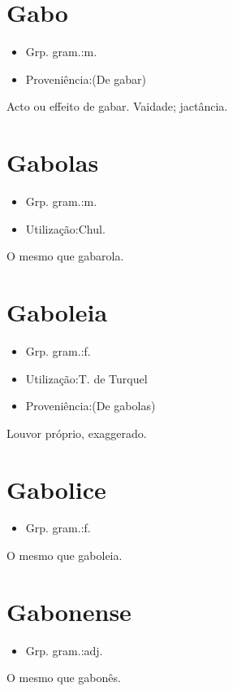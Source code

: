 \section{Gabo}
\begin{itemize}
\item {Grp. gram.:m.}
\end{itemize}
\begin{itemize}
\item {Proveniência:(De \textunderscore gabar\textunderscore )}
\end{itemize}
Acto ou effeito de gabar.
Vaidade; jactância.
\section{Gabolas}
\begin{itemize}
\item {Grp. gram.:m.}
\end{itemize}
\begin{itemize}
\item {Utilização:Chul.}
\end{itemize}
O mesmo que \textunderscore gabarola\textunderscore .
\section{Gaboleia}
\begin{itemize}
\item {Grp. gram.:f.}
\end{itemize}
\begin{itemize}
\item {Utilização:T. de Turquel}
\end{itemize}
\begin{itemize}
\item {Proveniência:(De \textunderscore gabolas\textunderscore )}
\end{itemize}
Louvor próprio, exaggerado.
\section{Gabolice}
\begin{itemize}
\item {Grp. gram.:f.}
\end{itemize}
O mesmo que \textunderscore gaboleia\textunderscore .
\section{Gabonense}
\begin{itemize}
\item {Grp. gram.:adj.}
\end{itemize}
O mesmo que \textunderscore gabonês\textunderscore .
